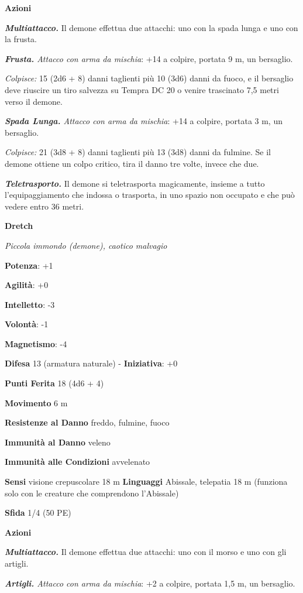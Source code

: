 \begin{multicols}{2}
\textbf{Azioni}

\emph{\textbf{Multiattacco.}} Il demone effettua due attacchi: uno con
la spada lunga e uno con la frusta.

\emph{\textbf{Frusta.} Attacco con arma da mischia}: +14 a colpire,
portata 9 m, un bersaglio.

\emph{Colpisce:} 15 (2d6 + 8) danni taglienti più 10 (3d6) danni da
fuoco, e il bersaglio deve riuscire un tiro salvezza su Tempra DC 20 o
venire trascinato 7,5 metri verso il demone.

\emph{\textbf{Spada Lunga.} Attacco con arma da mischia}: +14 a colpire,
portata 3 m, un bersaglio.

\emph{Colpisce:} 21 (3d8 + 8) danni taglienti più 13 (3d8) danni da
fulmine. Se il demone ottiene un colpo critico, tira il danno tre volte,
invece che due.

\emph{\textbf{Teletrasporto.}} Il demone si teletrasporta magicamente,
insieme a tutto l'equipaggiamento che indossa o trasporta, in uno spazio
non occupato e che può vedere entro 36 metri.

\textbf{Dretch}

\emph{Piccola immondo (demone), caotico malvagio}

\textbf{Potenza}: +1

\textbf{Agilità}: +0

\textbf{Intelletto}: -3

\textbf{Volontà}: -1

\textbf{Magnetismo}: -4

\textbf{Difesa} 13 (armatura naturale) - \textbf{Iniziativa}: +0

\textbf{Punti Ferita} 18 (4d6 + 4)

\textbf{Movimento} 6 m

\textbf{Resistenze al Danno} freddo, fulmine, fuoco

\textbf{Immunità al Danno} veleno

\textbf{Immunità alle Condizioni} avvelenato

\textbf{Sensi} visione crepuscolare 18 m
\textbf{Linguaggi} Abissale, telepatia 18 m (funziona solo con le
creature che comprendono l'Abissale)

\textbf{Sfida} 1/4 (50 PE)

\textbf{Azioni}

\emph{\textbf{Multiattacco.}} Il demone effettua due attacchi: uno con
il morso e uno con gli artigli.

\emph{\textbf{Artigli.} Attacco con arma da mischia}: +2 a colpire,
portata 1,5 m, un bersaglio.


\end{multicols}
